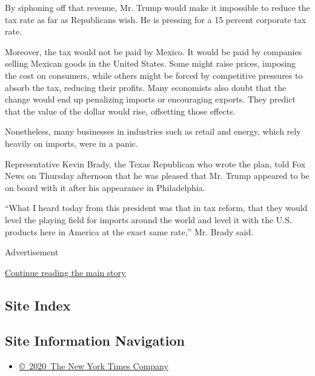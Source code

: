 By siphoning off that revenue, Mr. Trump would make it impossible to
reduce the tax rate as far as Republicans wish. He is pressing for a 15
percent corporate tax rate.

Moreover, the tax would not be paid by Mexico. It would be paid by
companies selling Mexican goods in the United States. Some might raise
prices, imposing the cost on consumers, while others might be forced by
competitive pressures to absorb the tax, reducing their profits. Many
economists also doubt that the change would end up penalizing imports or
encouraging exports. They predict that the value of the dollar would
rise, offsetting those effects.

Nonetheless, many businesses in industries such as retail and energy,
which rely heavily on imports, were in a panic.

Representative Kevin Brady, the Texas Republican who wrote the plan,
told Fox News on Thursday afternoon that he was pleased that Mr. Trump
appeared to be on board with it after his appearance in Philadelphia.

``What I heard today from this president was that in tax reform, that
they would level the playing field for imports around the world and
level it with the U.S. products here in America at the exact same
rate,'' Mr. Brady said.

Advertisement

\protect\hyperlink{after-bottom}{Continue reading the main story}

\hypertarget{site-index}{%
\subsection{Site Index}\label{site-index}}

\hypertarget{site-information-navigation}{%
\subsection{Site Information
Navigation}\label{site-information-navigation}}

\begin{itemize}
\tightlist
\item
  \href{https://help.nytimes.com/hc/en-us/articles/115014792127-Copyright-notice}{©~2020~The
  New York Times Company}
\end{itemize}

